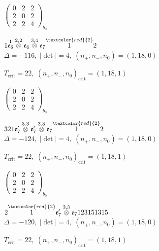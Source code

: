 \documentclass[10pt]{article}
\begin{document}
\hspace{2em}$\left(\begin{smallmatrix}0 & 2 & 2 \\ 2 & 0 & 2 \\ 2 & 2 & 4\end{smallmatrix}\right)_{\!b_0}$

\smallskip

$1\overset{1}{\mathfrak{e}_6}\overset{2,2}{\otimes}\mathfrak{e}_6\overset{3,4}{\otimes}\mathfrak{e}_7\overset{\textcolor{red}{2}}{1}2$ \quad $\Delta=-116,\; |\det|=4,\; (n_+,n_-,n_0)=(1,18,0)$

\hspace{1em}$T_{\text{crit}}=22,\; (n_+,n_-,n_0)_{\text{crit}}=(1,18,1)$

\hspace{2em}$\left(\begin{smallmatrix}0 & 2 & 2 \\ 2 & 0 & 2 \\ 2 & 2 & 4\end{smallmatrix}\right)_{\!b_0}$

\smallskip

$321\mathfrak{e}_7'\overset{3,3}{\otimes}\mathfrak{e}_7'\overset{3,3}{\otimes}\mathfrak{e}_7\overset{\textcolor{red}{2}}{1}2$ \quad $\Delta=-124,\; |\det|=4,\; (n_+,n_-,n_0)=(1,18,0)$

\hspace{1em}$T_{\text{crit}}=22,\; (n_+,n_-,n_0)_{\text{crit}}=(1,18,1)$

\hspace{2em}$\left(\begin{smallmatrix}0 & 2 & 2 \\ 2 & 0 & 2 \\ 2 & 2 & 4\end{smallmatrix}\right)_{\!b_0}$

\smallskip

$2\overset{\textcolor{red}{2}}{1}\mathfrak{e}_7'\overset{3,3}{\otimes}\mathfrak{e}_7123151315$ \quad $\Delta=-120,\; |\det|=4,\; (n_+,n_-,n_0)=(1,18,0)$

\hspace{1em}$T_{\text{crit}}=22,\; (n_+,n_-,n_0)_{\text{crit}}=(1,18,1)$
\end{document}
